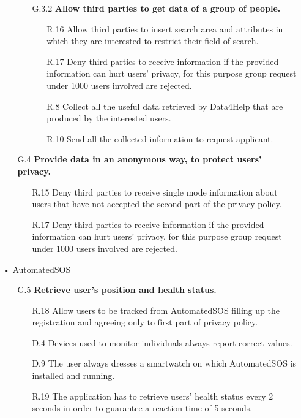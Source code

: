 \begin{enumerate}
\begin{enumerate}
\begin{enumerate}
    	\item [G.3.2] \textbf{Allow third parties to get data of a group of people.}
		\begin{enumerate}
    	\item [R.16] Allow third parties to insert search area and attributes in which they are interested to restrict their field of search.
    	\item [R.17] Deny third parties to receive information if the provided information can hurt users' privacy, for this purpose group request under 1000 users involved are rejected.
    	\item [R.8] Collect all the useful data retrieved by Data4Help that are produced by the interested users.
    	\item [R.10] Send all the collected information to request applicant.
    	\end{enumerate}
    	\end{enumerate}
    	
    \item [G.4] \textbf{Provide data in an anonymous way, to protect users' privacy.}
		\begin{enumerate}
    	\item [R.15] Deny third parties to receive single mode information about users that have not accepted the second part of the privacy policy.
    	\item [R.17] Deny third parties to receive information if the provided information can hurt users' privacy, for this purpose group request under 1000 users involved are rejected.
    	\end{enumerate}	
			
	\end{enumerate}
	
	
\item[•]{\Large AutomatedSOS}
	
	\begin{enumerate}
	\item [G.5] \textbf{Retrieve user's position and health status.}
		\begin{enumerate}
		\item [R.18] Allow users to be tracked from AutomatedSOS filling up the registration and agreeing only to first part of privacy policy.
		\item [D.4] Devices used to monitor individuals always report correct values.
		\item [D.9] The user always dresses a smartwatch on which AutomatedSOS is installed and running.    
		\item [R.19] The application has to retrieve users' health status every 2 seconds in order to guarantee a reaction time of 5 seconds.
		\end{enumerate}
	

\end{enumerate}
\end{enumerate}
